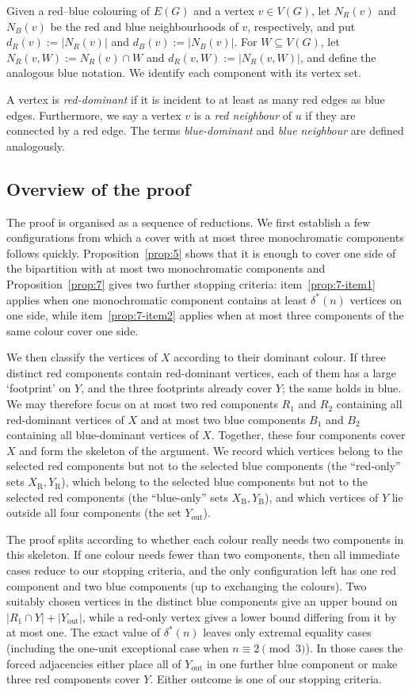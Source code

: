 \documentclass[12pt,reqno,a4paper]{amsart}
\newcommand{\out}{\mathrm{out}}
\newcommand{\R}{\mathrm{R}}
\newcommand{\B}{\mathrm{B}}
\begin{document}
Given a red--blue colouring of $E(G)$ and a vertex $v\in V(G)$, let $N_R(v)$
and $N_B(v)$ be the red and blue neighbourhoods of $v$, respectively, and put
$d_R(v):=|N_R(v)|$ and $d_B(v):=|N_B(v)|$. For $W\subseteq V(G)$, let
$N_R(v,W):=N_R(v)\cap W$ and $d_R(v,W):=|N_R(v,W)|$, and define the analogous
blue notation. We identify each component with its vertex set.

A vertex is \emph{red-dominant} if it is incident to at least as many red edges
as blue edges. Furthermore, we say a vertex $v$ is a \emph{red neighbour} of $u$ if
they are connected by a red edge. The terms \emph{blue-dominant} and
\emph{blue neighbour} are defined analogously. 

\subsection{Overview of the proof}


The proof is organised as a sequence of reductions. We first establish a few
configurations from which a cover with at most three monochromatic components
follows quickly. Proposition~\ref{prop:5} shows that it is enough to cover one
side of the bipartition with at most two monochromatic components and
Proposition~\ref{prop:7} gives two further stopping criteria:
item~\ref{prop:7-item1} applies when one monochromatic component contains at
least $\delta^*(n)$ vertices on one side, while item~\ref{prop:7-item2} applies
when at most three components of the same colour cover one side.

We then classify the vertices of $X$ according to their dominant colour. If
three distinct red components contain red-dominant vertices, each of them has a
large `footprint' on $Y$, and the three footprints already cover $Y$; the same
holds in blue. We may therefore focus on at most two red components $R_1$ and
$R_2$ containing all red-dominant vertices of $X$ and at most two blue
components $B_1$ and $B_2$ containing all blue-dominant vertices of $X$.
Together, these four components cover $X$ and form the skeleton of the argument.
We record which vertices belong to the selected red components but not to the
selected blue components (the ``red-only'' sets $X_{\R},Y_{\R}$), which belong
to the selected blue components but not to the selected red components (the
``blue-only'' sets $X_{\B},Y_{\B}$), and which vertices of $Y$ lie outside all
four components (the set $Y_{\out}$).

The proof splits according to whether each colour really needs two components in
this skeleton. If one colour needs fewer than two components, then all immediate
cases reduce to our stopping criteria, and the only configuration left has one
red component and two blue components (up to exchanging the colours). Two
suitably chosen vertices in the distinct blue components give an upper bound on
$|R_1\cap Y|+|Y_{\out}|$, while a red-only vertex gives a lower bound differing
from it by at most one. The exact value of $\delta^*(n)$ leaves only extremal
equality cases (including the one-unit exceptional case when $n\equiv2\pmod 3$).
In those cases the forced adjacencies either place all of $Y_{\out}$ in one
further blue component or make three red components cover $Y$. Either outcome
is one of our stopping criteria.
\end{document}
